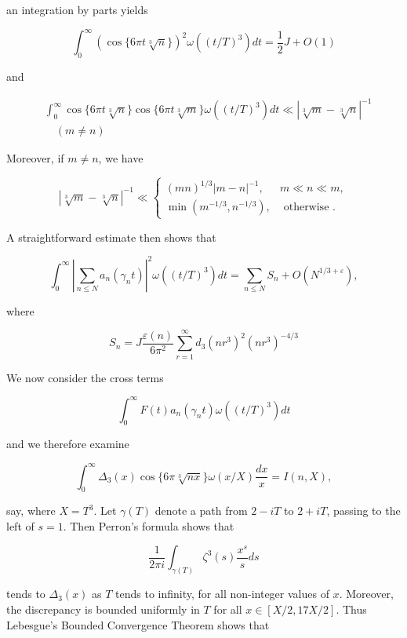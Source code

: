 \documentclass[10pt]{article}
\begin{document}
an integration by parts yields


\begin{equation*}
\int_{0}^{\infty}(\cos \{6 \pi t \sqrt[3]{n}\})^{2} \omega\left((t / T)^{3}\right) d t=\frac{1}{2} J+O(1) \tag{7.2}
\end{equation*}


and


\begin{align*}
& \int_{0}^{\infty} \cos \{6 \pi t \sqrt[3]{n}\} \cos \{6 \pi t \sqrt[3]{m}\} \omega\left((t / T)^{3}\right) d t \ll|\sqrt[3]{m}-\sqrt[3]{n}|^{-1}  \tag{7.3}\\
& \quad(m \neq n)
\end{align*}


Moreover, if $m \neq n$, we have

\[
|\sqrt[3]{m}-\sqrt[3]{n}|^{-1} \ll \begin{cases}(m n)^{1 / 3}|m-n|^{-1}, & m \ll n \ll m,  \tag{7.4}\\ \min \left(m^{-1 / 3}, n^{-1 / 3}\right), & \text { otherwise } .\end{cases}
\]

A straightforward estimate then shows that


\begin{equation*}
\int_{0}^{\infty}\left|\sum_{n \leq N} a_{n}\left(\gamma_{n} t\right)\right|^{2} \omega\left((t / T)^{3}\right) d t=\sum_{n \leq N} S_{n}+O\left(N^{1 / 3+\varepsilon}\right), \tag{7.5}
\end{equation*}


where

$$
S_{n}=J \frac{\varepsilon(n)}{6 \pi^{2}} \sum_{r=1}^{\infty} d_{3}\left(n r^{3}\right)^{2}\left(n r^{3}\right)^{-4 / 3}
$$

We now consider the cross terms

$$
\int_{0}^{\infty} F(t) a_{n}\left(\gamma_{n} t\right) \omega\left((t / T)^{3}\right) d t
$$

and we therefore examine

$$
\int_{0}^{\infty} \Delta_{3}(x) \cos \{6 \pi \sqrt[3]{n x}\} \omega(x / X) \frac{d x}{x}=I(n, X),
$$

say, where $X=T^{3}$. Let $\gamma(T)$ denote a path from $2-i T$ to $2+i T$, passing to the left of $s=1$. Then Perron's formula shows that

$$
\frac{1}{2 \pi i} \int_{\gamma(T)} \zeta^{3}(s) \frac{x^{s}}{s} d s
$$

tends to $\Delta_{3}(x)$ as $T$ tends to infinity, for all non-integer values of $x$. Moreover, the discrepancy is bounded uniformly in $T$ for all $x \in[X / 2,17 X / 2]$. Thus Lebesgue's Bounded Convergence Theorem shows that
\end{document}
